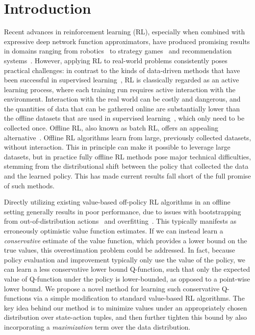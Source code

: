 \section{Introduction}
\vspace{-4pt}
Recent advances in reinforcement learning (RL), especially when combined with expressive deep network function approximators, have produced promising results in domains ranging from robotics~\citep{kalashnikov2018qtopt} to strategy games~\citep{alphastar} and recommendation systems~\citep{li2010contextual}. However, applying RL to real-world problems consistently poses practical challenges: in contrast to the kinds of data-driven methods that have been successful in supervised learning~\citep{resnet,bert}, RL is classically regarded as an active learning process, where each training run requires active interaction with the environment. Interaction with the real world can be costly and dangerous, and the quantities of data that can be gathered online are substantially lower than the offline datasets that are used in supervised learning~\citep{imagenet}, which only need to be collected once. Offline RL, also known as batch RL, offers an appealing alternative~\citep{ernst2005tree,fujimoto2018off,kumar2019stabilizing,agarwal2019optimistic,jaques2019way,siegel2020keep,levine2020offline}. Offline RL algorithms learn from large, previously collected datasets, without interaction. This in principle can make it possible to leverage large datasets, but in practice fully offline RL methods pose major technical difficulties, stemming from the distributional shift between the policy that collected the data and the learned policy. This has made current results fall short of the full promise of such methods.

Directly utilizing existing value-based off-policy RL algorithms in an offline setting generally results in poor performance, due to issues with bootstrapping from out-of-distribution actions~\citep{kumar2019stabilizing,fujimoto2018off} and overfitting~\citep{fu2019diagnosing,kumar2019stabilizing,agarwal2019optimistic}. This typically manifests as erroneously optimistic value function estimates.
If we can instead learn a \emph{conservative} estimate of the value function, which provides a lower bound on the true values, this overestimation problem could be addressed. In fact, because policy evaluation and improvement typically only use the value of the policy, we can learn a less conservative lower bound Q-function, such that only the expected value of Q-function under the policy is lower-bounded, as opposed to a point-wise lower bound.
We propose a novel method for learning such conservative Q-functions via a simple modification to standard value-based RL algorithms. The key idea behind our method is to minimize values under an appropriately chosen distribution over state-action tuples, and then further tighten this bound by also incorporating a \emph{maximization} term over the data distribution.

